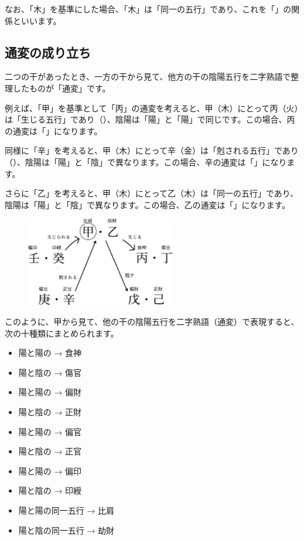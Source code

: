 \documentclass[a5paper,11pt,dvipdfmx]{tarticle}
\begin{document}
なお、「木」を基準にした場合、「木」は「同一の五行」であり、これを「」の関係といいます。

\subsection{通変の成り立ち}

二つの干があったとき、一方の干から見て、他方の干の陰陽五行を二字熟語で整理したものが「通変」です。

例えば、「甲」を基準として「丙」の通変を考えると、甲（木）にとって丙（火）は「生じる五行」であり（）、陰陽は「陽」と「陽」で同じです。この場合、丙の通変は「」になります。

同様に「辛」を考えると、甲（木）にとって辛（金）は「剋される五行」であり（）、陰陽は「陽」と「陰」で異なります。この場合、辛の通変は「」になります。

さらに「乙」を考えると、甲（木）にとって乙（木）は「同一の五行」であり、陰陽は「陽」と「陰」で異なります。この場合、乙の通変は「」になります。

\begin{figure}
  \includegraphics[width=65mm,angle=90]{figs/figure5-4.eps}
\end{figure}

このように、甲から見て、他の干の陰陽五行を二字熟語（通変）で表現すると、次の十種類にまとめられます。

\begin{itemize}
  \item 陽と陽の → 食神
  \item 陽と陰の → 傷官
  \item 陽と陽の → 偏財
  \item 陽と陰の → 正財
  \item 陽と陽の → 偏官
  \item 陽と陰の → 正官
  \item 陽と陽の → 偏印
  \item 陽と陰の → 印綬
  \item 陽と陽の同一五行 → 比肩
  \item 陽と陰の同一五行 → 劫財
\end{itemize}
\end{document}
